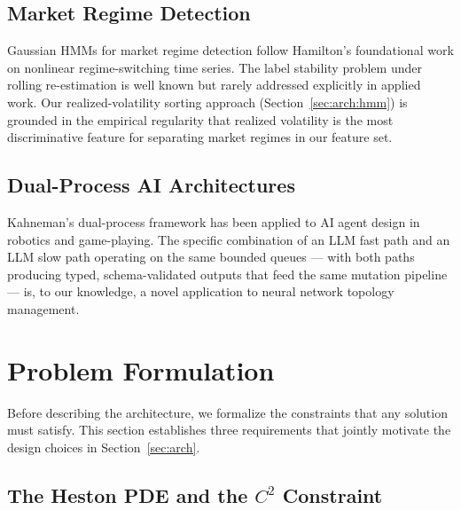 \documentclass[11pt,a4paper]{article}
\begin{document}
\subsection{Market Regime Detection}

Gaussian HMMs for market regime detection follow Hamilton's foundational work
\citep{hamilton1989new} on nonlinear regime-switching time series. The label stability
problem under rolling re-estimation is well known but rarely addressed explicitly in
applied work. Our realized-volatility sorting approach (Section~\ref{sec:arch:hmm}) is
grounded in the empirical regularity that realized volatility is the most discriminative
feature for separating market regimes in our feature set.

\subsection{Dual-Process AI Architectures}

Kahneman's dual-process framework \citep{kahneman2011thinking} has been applied to AI
agent design in robotics and game-playing. The specific combination of an LLM fast path
and an LLM slow path operating on the same bounded queues --- with both paths producing
typed, schema-validated outputs that feed the same mutation pipeline --- is, to our
knowledge, a novel application to neural network topology management.

\section{Problem Formulation}
\label{sec:formulation}

Before describing the architecture, we formalize the constraints that any solution must
satisfy. This section establishes three requirements that jointly motivate the design
choices in Section~\ref{sec:arch}.

\subsection{The Heston PDE and the $C^2$ Constraint}
\end{document}
